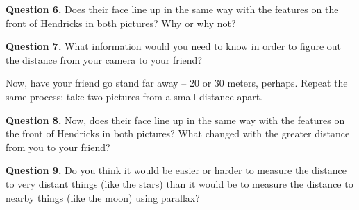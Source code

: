 \documentclass[11pt]{article}
\begin{document}
\textbf{Question 6.} Does their face line up in the same way with the features on the
front of Hendricks in both pictures? Why or why not?\\

\vspace*{1.5cm}
\hrulefill

\textbf{Question 7.} What information would you need to know in order to figure out the distance from your camera to your friend? 

\vspace*{1.5cm}
\hrulefill

Now, have your friend go stand far away -- 20 or 30 meters, perhaps. Repeat the same process: take two pictures from a small distance apart.

\textbf{Question 8.} Now, does their face line up in the same way with the features on the
front of Hendricks in both pictures? What changed with the greater distance from you to your friend?\\


\vspace*{1.5cm}
\hrulefill

\textbf{Question 9.} Do you think it would be easier or harder to measure the distance to very distant things (like the stars) than it would be to measure the distance to nearby things (like the moon) using parallax?

\vspace*{1.5cm}
\hrulefill
\end{document}
